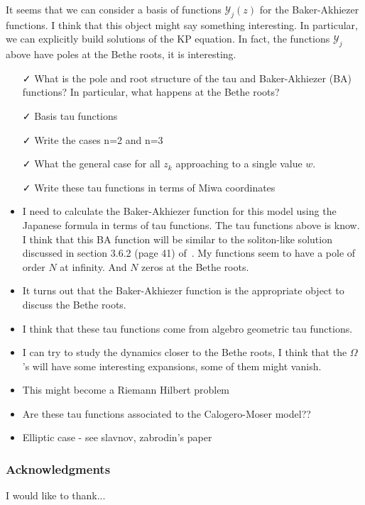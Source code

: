 \documentclass[a4paper,11pt]{amsart}
\begin{document}
It seems that we can consider a basis of functions \(\mathcal{Y}_j(z)\) for the Baker-Akhiezer
functions. I think that this object might say something interesting. In particular, we can
explicitly build solutions of the KP equation. In fact, the functions \(\mathcal{Y}_j\)
above have poles at the Bethe roots, it is interesting. 
\begin{itemize}
\item[\faCheck] What is the pole and root structure of the tau and Baker-Akhiezer (BA) functions?
  In particular, what happens at the Bethe roots?
\item[\faCheck] Basis tau functions
\item[\faCheck] Write the cases n=2 and n=3
\item[\faCheck] What the general case for all \(z_k\) approaching to a single
  value \(w\). 
\item[\faCheck] Write these tau functions in terms of Miwa coordinates
\item I need to calculate the Baker-Akhiezer function for this model using the Japanese formula
  in terms of tau functions. The tau functions above is know. I think that this BA function
  will be similar to the soliton-like solution discussed in section 3.6.2 (page 41) of~\cite{Zabrodin2018}. 
  My functions seem to have a pole of order \(N\) at infinity. And \(N\) zeros at the Bethe roots. 
\item It turns out that the Baker-Akhiezer function is the appropriate object to discuss
  the Bethe roots. 
  \item I think that these tau functions come from algebro geometric tau functions. 
  \item I can try to study the dynamics closer to the Bethe roots, I think that the
    \(\Omega\)'s will have some interesting expansions, some of them might vanish. 
  \item This might become a Riemann Hilbert problem
  \item Are these tau functions associated to the Calogero-Moser model??
  \item Elliptic case - see slavnov, zabrodin's paper
\end{itemize}





\subsubsection*{Acknowledgments}
I would like to thank...

\printbibliography
\end{document}
